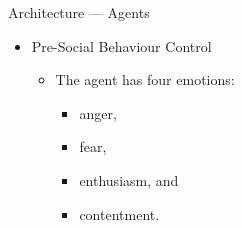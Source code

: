 \documentclass{beamer}
\def\tikzoverlay{%
   \tikz[baseline,overlay]\node[every overlay node]
}%
\begin{document}
      
   
   \begin{frame}{Architecture --- Agents}
      \begin{itemize}   
         \item Pre-Social Behaviour Control
         \pause
            \begin{itemize}
               \item The agent has four emotions:
                  \begin{itemize}
                     \item anger,
                     \item fear,
                     \item enthusiasm, and
                     \item contentment.   
                  \end{itemize}
            \end{itemize}
      \end{itemize}
   \end{frame}
      
\end{document}

